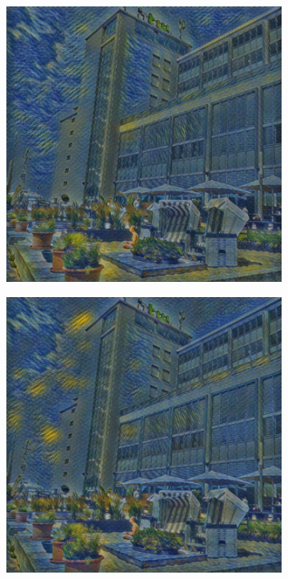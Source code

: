 \begin{figure}[H]
    \centering
    \begin{subfigure}[h]{0.15\textwidth}
        \centering
        \includegraphics[width=\textwidth]{resources/content/experiments/net1.jpg}
    \end{subfigure}
    \begin{subfigure}[h]{0.15\textwidth}
        \centering
        \includegraphics[width=\textwidth]{resources/content/experiments/net2.jpg}

\end{subfigure}
\end{figure}
